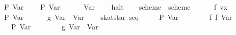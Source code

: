 \begin{isabellebody}
\ \ {}\ P\ {}Var\ {}{}\isanewline
\ \ {}\ P\ {}Var\ {}{}\isanewline
\ \ {}\ {}\ {}{}\ Var\ {}\isanewline
\ \ {}\ halt\isanewline
\ \ {}{}\isanewline
\isanewline
{}\isamarkupfalse%
\ scheme{}\ \ {}scheme{}\ {}\isanewline
\ \ {}\ {}\ {}{}\ f\ vx\isanewline
\ \ {}\ P\ {}Var\ {}{}\isanewline
\ \ {}\ {}\ {}{}\ g\ {}Var\ {}{}\ {}Var\ {}{}\isanewline
\ \ {}\ skat{}star\ {}seq\isanewline
\ \ \ \ {}\ {}{}P\ {}Var\ {}{}{}\isanewline
\ \ \ \ {}\ {}\ {}{}\ f\ {}f\ {}Var\ {}{}{}\isanewline
\ \ \ \ {}\ P\ {}Var\ {}{}\isanewline
\ \ \ \ {}\ {}\ {}{}\ g\ {}Var\ {}{}\ {}Var\ {}{}\isanewline
\ \ \ \ {}{}\isanewline

\end{isabellebody}
